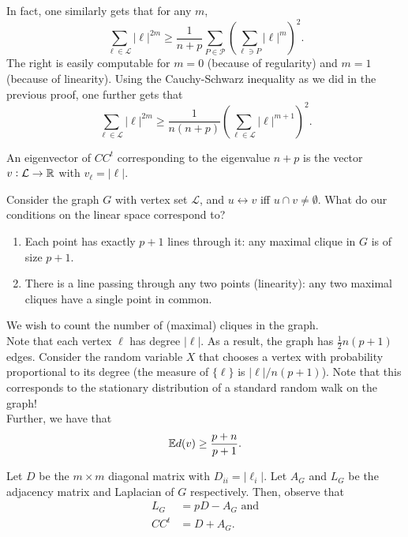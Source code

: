 \documentclass{article}
\begin{document}
	In fact, one similarly gets that for any $m$,
	\[ \sum_{\ell \in \mathcal{L}} |\ell|^{2m} \ge \frac{1}{n+p} \sum_{P \in \mathcal{P}} \left( \sum_{\ell \ni P} |\ell|^m \right)^2. \]
	The right is easily computable for $m = 0$ (because of regularity) and $m = 1$ (because of linearity).
	Using the Cauchy-Schwarz inequality as we did in the previous proof, one further gets that
	\[ \sum_{\ell \in \mathcal{L}} |\ell|^{2m} \ge \frac{1}{n(n+p)} \left(\sum_{\ell \in \mathcal{L}} |\ell|^{m+1}\right)^2. \]
	

	\begin{porism}
		An eigenvector of $CC^t$ corresponding to the eigenvalue $n+p$ is the vector $v : \mathcal{L} \to \mathbb{R}$ with $v_\ell = |\ell|$.
	\end{porism}


	Consider the graph $G$ with vertex set $\mathcal{L}$, and $u \leftrightarrow v$ iff $u \cap v \ne \emptyset$. What do our conditions on the linear space correspond to?
	\begin{enumerate}
		\item Each point has exactly $p+1$ lines through it: any maximal clique in $G$ is of size $p+1$.
		\item There is a line passing through any two points (linearity): any two maximal cliques have a single point in common.
	\end{enumerate}

	We wish to count the number of (maximal) cliques in the graph.\\
	Note that each vertex $\ell$ has degree $|\ell|$. As a result, the graph has $\frac{1}{2}n(p+1)$ edges.
	Consider the random variable $X$ that chooses a vertex with probability proportional to its degree (the measure of $\{\ell\}$ is $|\ell|/n(p+1)$). Note that this corresponds to the stationary distribution of a standard random walk on the graph!\\
	Further, we have that
	\[ \mathbb{E} d(v) \ge \frac{p+n}{p+1}. \]

	Let $D$ be the $m \times m$ diagonal matrix with $D_{ii} = |\ell_i|$. Let $A_G$ and $L_G$ be the adjacency matrix and Laplacian of $G$ respectively. Then, observe that
	\begin{align*}
		L_G &= pD - A_G \text{ and} \\
		CC^t &= D + A_G.
	\end{align*}
	
\end{document}
